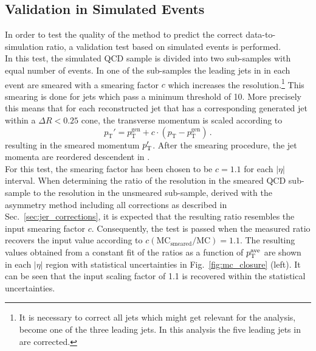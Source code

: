 \subsection{Validation in Simulated Events}
\label{sec:jer_validation_closure}
In order to test the quality of the method to predict the correct data-to-simulation ratio, a validation test based on simulated events is performed. \\ 
In this test, the simulated \pythia QCD sample is divided into two sub-samples with equal number of events. In one of the sub-samples the leading jets in \pt in each event are smeared with a smearing factor $c$ which increases the \pt resolution.\footnote{It is necessary to correct all jets which might get relevant for the analysis, \ie become one of the three leading jets. In this analysis the five leading jets in \pt are corrected.} This smearing is done for jets which pass a minimum \pt threshold of 10\gev. More precisely this means that for each reconstructed jet that has a corresponding generated jet within a $\Delta R < 0.25$ cone, the transverse momentum is scaled according to
\begin{equation}
 p_\mathrm{T}' = p^\mathrm{gen}_\mathrm{T} + c \cdot (p_\mathrm{T} - p^\mathrm{gen}_\mathrm{T}) \, .
\label{eq:smear_gen}
\end{equation} 
resulting in the smeared momentum $p_{\text{T}}'$. After the smearing procedure, the jet momenta are reordered descendent in \pt.\\
For this test, the smearing factor has been chosen to be $c = 1.1$ for each $|\eta|$ interval. When determining the ratio of the resolution in the smeared QCD sub-sample to the resolution in the unsmeared sub-sample, derived with the asymmetry method including all corrections as described in Sec.~\ref{sec:jer_corrections}, it is expected that the resulting ratio resembles the input smearing factor $c$. Consequently, the test is passed when the measured ratio recovers the input value according to $c\mathrm{(MC_{smeared}/MC)} = 1.1$. The resulting values obtained from a constant fit of the ratios as a function of $p_{\text{T}}^\mathrm{ave}$ are shown in each $|\eta|$ region with statistical uncertainties in Fig.~\ref{fig:mc_closure} (left). It can be seen that the input scaling factor of 1.1 is recovered within the statistical uncertainties.

